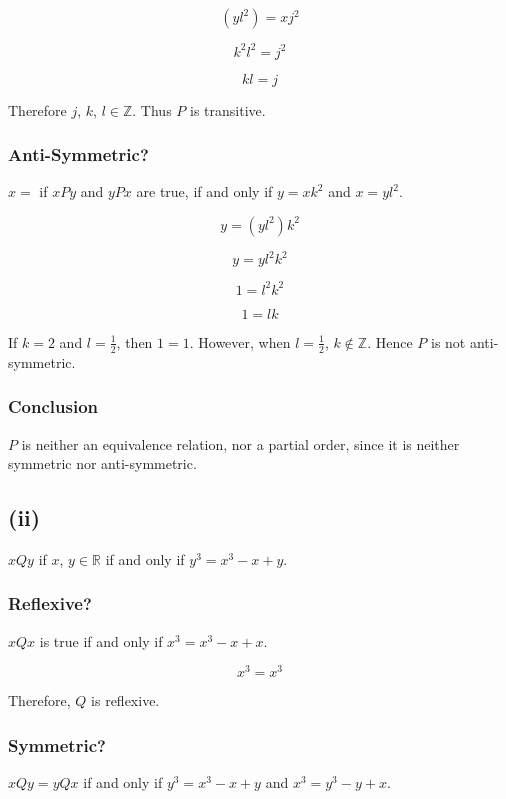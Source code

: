 \documentclass[a4paper,12pt]{article}
\begin{document}
\[ (yl^{2}) = xj^{2} \]

\[ k^{2}l^{2} = j^{2} \]

\[ kl = j \]

\noindent Therefore $j$, $k$, $l \in \mathbb{Z}$. Thus $P$ is transitive.

\subsubsection*{Anti-Symmetric?}

$x = $ if $xPy$ and $yPx$ are true, if and only if $y = x k^{2}$ and $x
= y l^{2}$.

\[ y = (y l^{2}) k^{2} \]

\[ y = y l^{2} k^{2} \]

\[ 1 = l^{2} k^{2} \]

\[ 1 = l k \]

\noindent If $k = 2$ and $l = \frac{1}{2}$, then $1 = 1$. However, when
$l = \frac{1}{2}$, $k \not\in \mathbb{Z}$. Hence $P$ is not
anti-symmetric.

\subsubsection*{Conclusion}

\noindent $P$ is neither an equivalence relation, nor a partial order, since it is
neither symmetric nor anti-symmetric.

\subsection*{(ii)}

$xQy$ if $x$, $y \in \mathbb{R}$ if and only if $y^{3} = x^{3} - x + y$.

\subsubsection*{Reflexive?}

$xQx$ is true if and only if $x^{3} = x^{3} - x + x$.

\[ x^{3} = x^{3} \]

\noindent Therefore, $Q$ is reflexive.

\subsubsection*{Symmetric?}

$xQy = yQx$ if and only if $y^{3} = x^{3} - x + y$ and $x^{3} = y^{3} -
y + x$.
\end{document}
